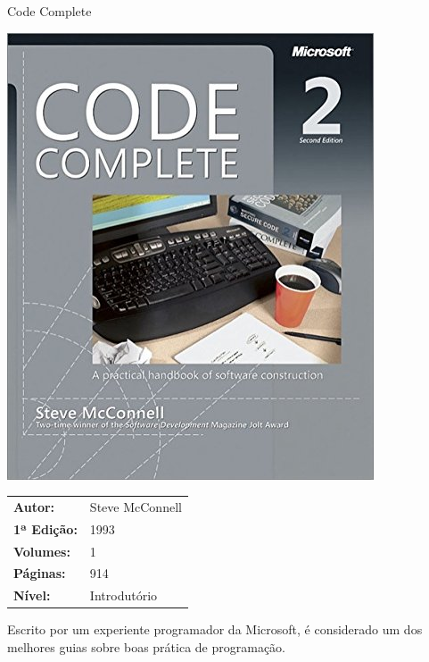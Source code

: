\begin{frame}[fragile]{Code Complete}

    \begin{minipage}{0.4\textwidth}
        \includegraphics[scale=0.25]{steve.jpg}
    \end{minipage}
    \begin{minipage}{0.5\textwidth}
        \begin{small}
            \begin{tabularx}{0.95\textwidth}{lX}
                \textbf{Autor:} & Steve McConnell \\
                \textbf{1ª Edição:} & 1993 \\
                \textbf{Volumes:} & 1 \\
                \textbf{Páginas:} & 914 \\
                \textbf{Nível:} & Introdutório \\
            \end{tabularx}
        \end{small}
    \end{minipage}

    \vspace{0.2in} 

    Escrito por um experiente programador da Microsoft, é considerado um dos melhores guias
    sobre boas prática de programação.

\end{frame}

